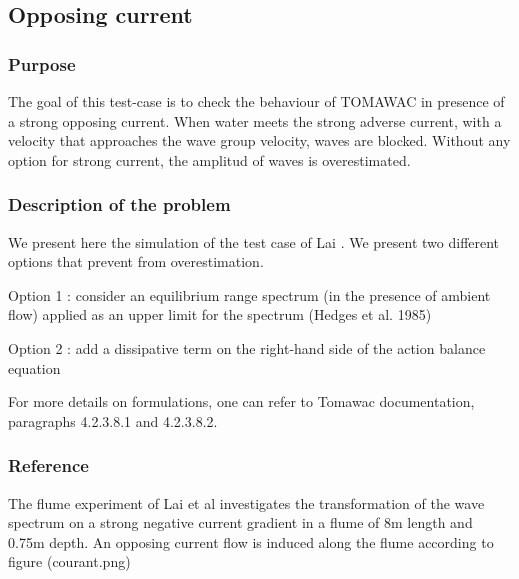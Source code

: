 \subsection{Opposing current}
%

%
\subsubsection{Purpose}
%
The goal of this test-case is to check the behaviour of TOMAWAC in presence of a strong opposing current. When water meets the strong adverse current, with a velocity that approaches the wave group velocity, waves are blocked. Without any option for strong current, the amplitud of waves is overestimated.

%
\subsubsection{Description of the problem}
%
We present here the simulation of the test case of Lai \cite{lai}. We present two different options that prevent from overestimation.

Option 1 : consider an equilibrium range spectrum (in the presence of ambient flow) applied as an upper limit for the spectrum \cite{hedges} (Hedges et al. 1985)

Option 2 : add a dissipative term on the right-hand side of the action balance equation \cite{Westhuysen_2012}

For more details on formulations, one can refer to Tomawac documentation, paragraphs 4.2.3.8.1 and 4.2.3.8.2.

%
\subsubsection{Reference}
%
The flume experiment of Lai et al  \cite{lai} investigates the transformation of the wave spectrum on a strong negative current gradient in a flume of 8m length and 0.75m depth. An opposing current flow is induced along the flume according to figure (courant.png)


%
%
